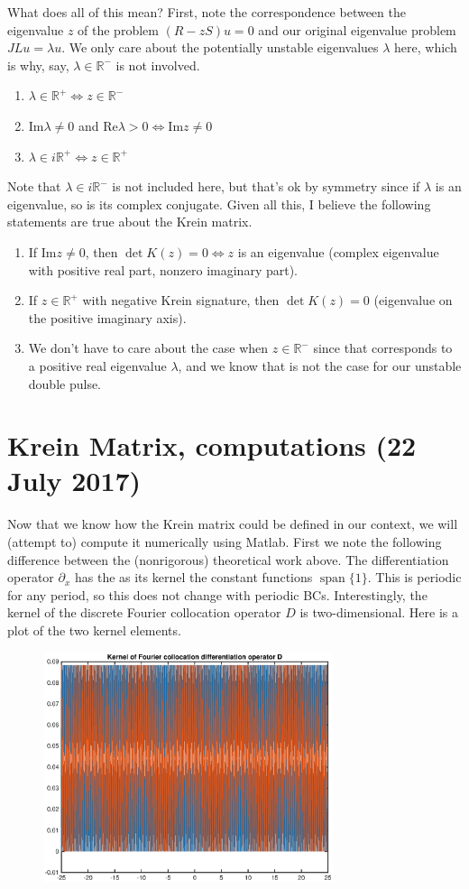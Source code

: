 \documentclass[12pt]{article}
\def\R{{\mathbb R}}
\DeclareMathOperator{\spn}{span}
\begin{document}
What does all of this mean? First, note the correspondence between the eigenvalue $z$ of the problem $(R - zS)u = 0$ and our original eigenvalue problem $JLu = \lambda u$. We only care about the potentially unstable eigenvalues $\lambda$ here, which is why, say, $\lambda \in \R^-$ is not involved.
\begin{enumerate}
	\item $\lambda \in \R^+ \iff z \in \R^-$
	\item $\textrm{Im} \lambda \neq 0$ and $\textrm{Re} \lambda > 0 \iff \textrm{Im} z \neq 0$
	\item $\lambda \in i\R^+ \iff z \in \R^+$  
\end{enumerate}
Note that $\lambda \in i\R^-$ is not included here, but that's ok by symmetry since if $\lambda$ is an eigenvalue, so is its complex conjugate. Given all this, I believe the following statements are true about the Krein matrix. 
\begin{enumerate}
	\item If $\textrm{Im} z \neq 0$, then $\det K(z) = 0 \iff z$ is an eigenvalue (complex eigenvalue with positive real part, nonzero imaginary part).
	\item If $z \in \R^+$ with negative Krein signature, then $\det K(z) = 0$ (eigenvalue on the positive imaginary axis).
	\item We don't have to care about the case when $z \in \R^-$ since that corresponds to a positive real eigenvalue $\lambda$, and we know that is not the case for our unstable double pulse.
\end{enumerate}

\section{Krein Matrix, computations (22 July 2017)}

Now that we know how the Krein matrix could be defined in our context, we will (attempt to) compute it numerically using Matlab. First we note the following difference between the (nonrigorous) theoretical work above. The differentiation operator $\partial_x$ has the as its kernel the constant functions $\spn \{1 \}$. This is periodic for any period, so this does not change with periodic BCs. Interestingly, the kernel of the discrete Fourier collocation operator $D$ is two-dimensional. Here is a plot of the two kernel elements.

\begin{figure}[H]
	\includegraphics[width=8.5cm]{kerD}
\end{figure}
\end{document}
